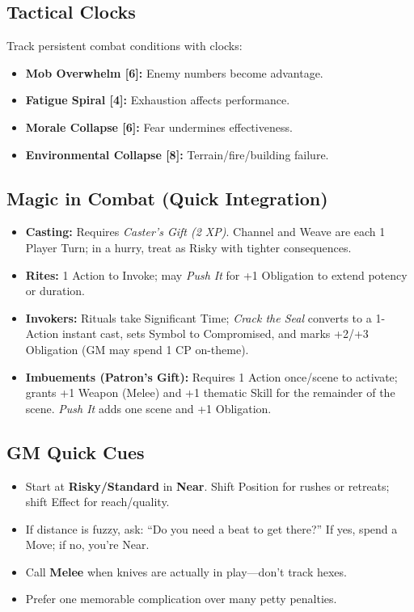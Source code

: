 \subsection{Tactical Clocks}
Track persistent combat conditions with clocks:
\begin{itemize}
  \item \textbf{Mob Overwhelm [6]:} Enemy numbers become advantage.
  \item \textbf{Fatigue Spiral [4]:} Exhaustion affects performance.
  \item \textbf{Morale Collapse [6]:} Fear undermines effectiveness.
  \item \textbf{Environmental Collapse [8]:} Terrain/fire/building failure.
\end{itemize}

\subsection{Magic in Combat (Quick Integration)}
\begin{itemize}
  \item \textbf{Casting:} Requires \emph{Caster’s Gift (2 XP)}. Channel and Weave are each 1 Player Turn; in a hurry, treat as Risky with tighter consequences.
  \item \textbf{Rites:} 1 Action to Invoke; may \emph{Push It} for +1 Obligation to extend potency or duration.
  \item \textbf{Invokers:} Rituals take Significant Time; \emph{Crack the Seal} converts to a 1-Action instant cast, sets Symbol to Compromised, and marks +2/+3 Obligation (GM may spend 1 CP on-theme).
  \item \textbf{Imbuements (Patron’s Gift):} Requires 1 Action once/scene to activate; grants +1 Weapon (Melee) and +1 thematic Skill for the remainder of the scene. \emph{Push It} adds one scene and +1 Obligation.
\end{itemize}

\subsection{GM Quick Cues}
\begin{itemize}
  \item Start at \textbf{Risky/Standard} in \textbf{Near}. Shift Position for rushes or retreats; shift Effect for reach/quality.
  \item If distance is fuzzy, ask: ``Do you need a beat to get there?'' If yes, spend a Move; if no, you’re Near.
  \item Call \textbf{Melee} when knives are actually in play—don’t track hexes.
  \item Prefer one memorable complication over many petty penalties.
\end{itemize}

